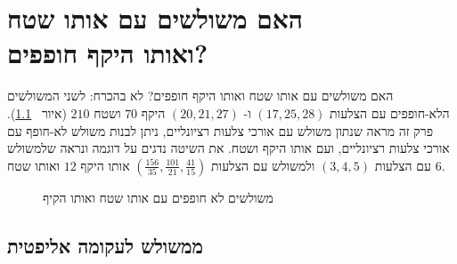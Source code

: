 


\chapter[\R{האם משולשים עם אותו שטח ואותו היקף חופפים?}]{האם משולשים עם אותו שטח\\
ואותו היקף חופפים?}
\label{c.congruent}


האם משולשים עם אותו שטח ואותו היקף חופפים? לא בהכרח: לשני המשולשים הלא-חופפים עם הצלעות
$(17,25,28)$
ו-%
$(20,21,27)$
היקף
$70$
ושטח 
$210$
(איור%
~\ref{f.congruent-first-example}).
פרק זה מראה שנתון משולש עם אורכי צלעות רציונליים, ניתן לבנות משולש לא-חופף עם אורכי צלעות רציונליים, ועם אותו היקף ושטח. את השיטה נדגים על דוגמה ונראה שלמשולש עם הצלעות 
$(3,4,5)$
ולמשולש עם הצלעות
$(\frac{156}{35},\frac{101}{21},\frac{41}{15})$
אותו היקף
$12$
ואותו שטח
$6$.

\begin{figure}[tb]
\begin{center}
\end{center}
\caption{משולשים לא חופפים עם אותו שטח ואותו הקיף}\label{f.congruent-first-example}
\end{figure}

\section{ממשולש לעקומה אליפטית}

